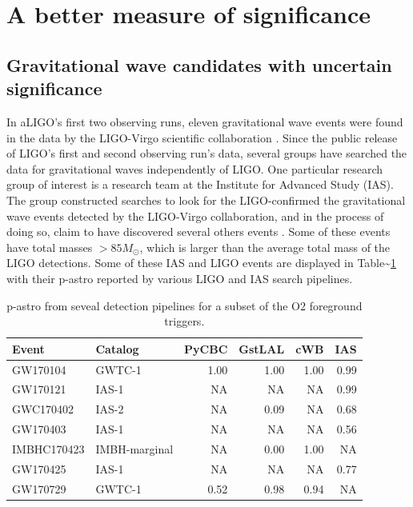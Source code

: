 \documentclass[%
 reprint,
 amsmath,amssymb,
 aps,
]{revtex4-2}
\begin{document}
\hypertarget{a-better-measure-of-significance}{%
\section{A better measure of significance}\label{a-better-measure-of-significance}}

\hypertarget{gravitational-wave-candidates-with-uncertain-significance}{%
\subsection{Gravitational wave candidates with uncertain significance}\label{gravitational-wave-candidates-with-uncertain-significance}}

In aLIGO's first two observing runs, eleven gravitational wave events were found in the data by the LIGO-Virgo
scientific collaboration \citep{abbott2019gwtc}. Since the public release of LIGO's first and second observing run's data,
several groups have searched the data for gravitational waves independently of LIGO. One particular research group of
interest is a research team at the Institute for Advanced Study (IAS). The group constructed searches to look for the
LIGO-confirmed the gravitational wave events detected by the LIGO-Virgo collaboration, and in the process of doing so,
claim to have discovered several others events \citep{IAS0, IAS1, IAS2}. Some of these events have total masses \(>85 M_{\odot}\), which is larger than the average total mass of the LIGO detections. Some of these IAS and LIGO events are
displayed in Table\textasciitilde\ref{tab:O2significancesWObcr} with their p-astro reported by various LIGO and IAS search pipelines.

\begin{table}[t]

\caption[p-astro for various O2 foreground triggers]{\label{tab:O2significancesWObcr}p-astro from seveal detection pipelines for a subset of the O2 foreground triggers.}
\centering
\begin{tabular}{llrrrr}
\toprule
Event & Catalog & PyCBC & GstLAL & cWB & IAS\\
\midrule
GW170104 & GWTC-1 & 1.00 & 1.00 & 1.00 & 0.99\\
GW170121 & IAS-1 & NA & NA & NA & 0.99\\
GWC170402 & IAS-2 & NA & 0.09 & NA & 0.68\\
GW170403 & IAS-1 & NA & NA & NA & 0.56\\
IMBHC170423 & IMBH-marginal & NA & 0.00 & 1.00 & NA\\
\addlinespace
GW170425 & IAS-1 & NA & NA & NA & 0.77\\
GW170729 & GWTC-1 & 0.52 & 0.98 & 0.94 & NA\\
\bottomrule
\end{tabular}
\end{table}
\end{document}
